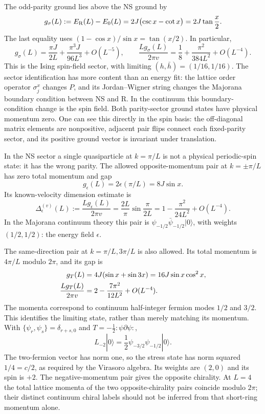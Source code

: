\begin{example}
The odd-parity ground lies above the NS ground by
\begin{equation}
 g_\sigma(L):=E_{\rm R}(L)-E_0(L)
 =2J\bigl(\csc x-\cot x\bigr)
 =2J\tan\frac x2.
 \label{eq:scaling-Ising-spin-gap}
\end{equation}
The last equality uses
$(1-\cos x)/\sin x=\tan(x/2)$.
In particular,
\[
 g_\sigma(L)=\frac{\pi J}{2L}
             +\frac{\pi^3J}{96L^3}+O(L^{-5}),
 \qquad
 \frac{L g_\sigma(L)}{2\pi v}
 =\frac18+\frac{\pi^2}{384L^2}+O(L^{-4}).
\]
This is the Ising spin-field sector, with limiting
$(h,\bar h)=(1/16,1/16)$. The sector identification has more
content than an energy fit: the lattice order operator
$\sigma_j^x$ changes $P$, and its Jordan--Wigner string changes
the Majorana boundary condition between NS and R.
In the continuum this boundary-condition change is the spin
field. Both parity-sector ground states have physical momentum
zero. One can see this directly in the spin basis: the
off-diagonal matrix elements are nonpositive, adjacent pair
flips connect each fixed-parity sector, and its positive ground
vector is invariant under translation.

In the NS sector a single quasiparticle at $k=\pi/L$ is
not a physical periodic-spin state: it has the wrong parity.
The allowed opposite-momentum pair at $k=\pm\pi/L$ has
zero total momentum and gap
\begin{equation}
 g_\epsilon(L)=2\epsilon(\pi/L)=8J\sin x.
 \label{eq:scaling-Ising-energy-gap}
\end{equation}
Its known-velocity dimension estimate is
\begin{equation}
 \Delta_\epsilon^{(v)}(L)
 :=\frac{L g_\epsilon(L)}{2\pi v}
 =\frac{2L}{\pi}\sin\frac{\pi}{2L}
 =1-\frac{\pi^2}{24L^2}+O(L^{-4}).
 \label{eq:scaling-Ising-epsilon-v}
\end{equation}
In the Majorana continuum theory this pair is
$\psi_{-1/2}\bar\psi_{-1/2}|0\rangle$, with weights
$(1/2,1/2)$: the energy field $\epsilon$.

The same-direction pair at $k=\pi/L,3\pi/L$ is also allowed.
Its total momentum is $4\pi/L$ modulo $2\pi$, and its gap is
\begin{align}
 g_T(L)&=4J(\sin x+\sin3x)
        =16J\sin x\cos^2x,\label{eq:scaling-Ising-stress-gap}\\
 \frac{Lg_T(L)}{2\pi v}
       &=2-\frac{7\pi^2}{12L^2}+O(L^{-4}).\notag
\end{align}
The momenta correspond to continuum half-integer fermion modes
$1/2$ and $3/2$. This identifies the limiting state, rather
than merely matching its momentum. With
$\{\psi_r,\psi_s\}=\delta_{r+s,0}$ and
$T=-\tfrac12:\!\psi\partial\psi\!:$,
\[
 L_{-2}|0\rangle
 =\frac12\psi_{-3/2}\psi_{-1/2}|0\rangle.
\]
The two-fermion vector has norm one, so the stress state has
norm squared $1/4=c/2$, as required by the Virasoro algebra.
Its weights are $(2,0)$ and its spin is $+2$.
The negative-momentum pair gives the opposite chirality.
At $L=4$ the total lattice momenta of the two opposite-chirality
pairs coincide modulo $2\pi$;
their distinct continuum chiral labels should not be inferred
from that short-ring momentum alone.


\end{example}
